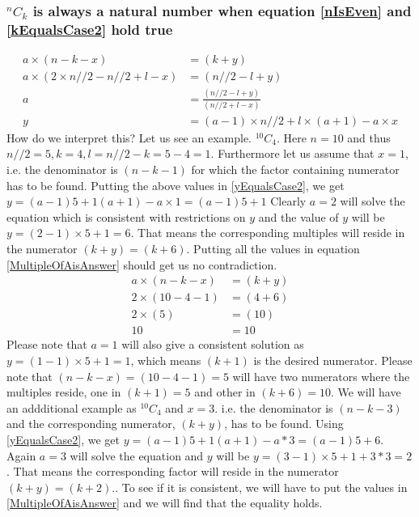 \documentclass[10pt, twoside]{article}
\newcommand*{\Combination}[2]{{}^{#1}C_{#2}}%
\begin{document}
\subsubsection{$\Combination{n}{k}$ is always a natural number when equation \eqref{nIsEven} and \eqref{kEqualsCase2} hold true}\label{ProofkEqualsCase2}
\begin{align}
	a \times (n-k-x) &= (k+y) \nonumber \\
	a \times (2\times n//2 - n//2 + l - x) &= (n//2 - l + y) \nonumber \\
	a &= \frac{(n//2 - l + y)}{(n//2 + l - x)} \nonumber \\
	y &= (a-1)\times n//2 + l \times (a+1) - a\times x \label{yEqualsCase2}	
\end{align}
How do we interpret this? Let us see an example. \newline
$\Combination{10}{4}$. Here $n = 10$ and thus $n//2 = 5, k = 4, l = n//2 - k = 5 -4 = 1$. Furthermore let us assume that $x = 1$, i.e. the denominator is $(n-k-1)$ for which the factor containing numerator has to be found.\newline
Putting the above values in \eqref{yEqualsCase2}, we get
$y = (a-1)5+1(a+1)-a\times 1 = (a-1)5+1$\newline
Clearly $a = 2$ will solve the equation which is consistent with restrictions on $y$ and the value of $y$ will be $y=(2-1)\times5 + 1=6$. That means the corresponding multiples will reside in the numerator $(k+y)=(k+6)$.\newline
Putting all the values in equation \eqref{MultipleOfAisAnswer} should get us no contradiction.
\begin{align}
	a \times (n-k-x) &= (k+y) \nonumber \\
	2 \times (10-4-1) &= (4+6) \nonumber \\
	2 \times (5) &= (10) \nonumber \\
	10 &= 10 \nonumber
\end{align}
Please note that $a = 1$ will also give a consistent solution as $y=(1-1)\times5 + 1=1$, which means $(k+1)$ is the desired numerator. Please note that $(n-k-x)=(10-4-1)=5$ will have two numerators where the multiples reside, one in $(k+1)=5$ and other in $(k+6)=10$.
We will have an addditional example as $\Combination{10}{4}$ and $x = 3$. i.e. the denominator is $(n-k-3)$ and the corresponding numerator, $(k+y)$, has to be found. Using \eqref{yEqualsCase2}, we get $y = (a-1)5+1(a+1)-a*3 = (a-1)5+6$\newline. Again $a=3$ will solve the equation and $y$ will be $y=(3-1)\times5 +1+ 3*3=2$. That means the corresponding factor will reside in the numerator $(k+y)=(k+2)$.\newline. To see if it is consistent, we will have to put the values in \eqref{MultipleOfAisAnswer} and we will find that the equality holds.
\end{document}
